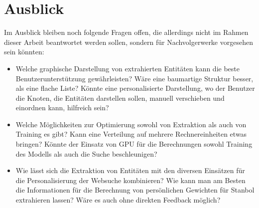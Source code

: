 \section{Ausblick}
Im Ausblick bleiben noch folgende Fragen offen, die allerdings nicht im Rahmen dieser Arbeit beantwortet werden sollen, sondern für Nachvolgerwerke vorgesehen sein könnten:
\begin{itemize}
\item Welche graphische Darstellung von extrahierten Entitäten kann die beste Benutzerunterstützung gewährleisten? Wäre eine baumartige Struktur besser, als eine flache Liste? Könnte eine personalisierte Darstellung, wo der Benutzer die Knoten, die Entitäten darstellen sollen, manuell verschieben und einordnen kann, hilfreich sein?
\item Welche Möglichkeiten zur Optimierung sowohl von Extraktion als auch von Training es gibt? Kann eine Verteilung auf mehrere Rechnereinheiten etwas bringen? Könnte der Einsatz von GPU für die Berechnungen sowohl Training des Modells als auch die Suche beschleunigen?
\item Wie lässt sich die Extraktion von Entitäten mit den diversen Einsätzen für die Personalisierung der Websuche kombinieren? Wie kann man am Besten die Informationen für die Berechnung von persönlichen Gewichten für Stanbol extrahieren lassen? Wäre es auch ohne direkten Feedback möglich?
\end{itemize}